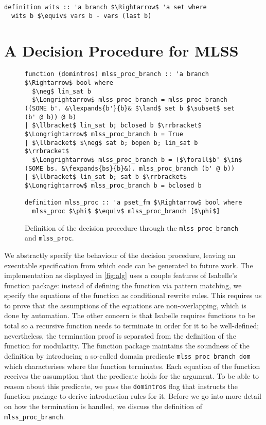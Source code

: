 \documentclass[sigplan,10pt,anonymous,review]{acmart}
\newcommand{\lefttrianglebar}{\mathrel{\tikz[baseline]{\draw (1ex, 0.75ex) -- (0, 1.25ex) -- (0, 0.25ex) -- cycle; \draw (0, 0.75ex) -- (1ex, 0.75ex);}}}
\newcommand{\lefttriangle}{\mathrel{\tikz[baseline]{\draw (1ex, 0.75ex) -- (0, 1.25ex) -- (0, 0.25ex) -- cycle;}}}
\newcommand{\lexpands}[2]{#1 $\lefttriangle$ #2}
\newcommand{\fexpands}[2]{#1 $\lefttrianglebar$ #2}
\begin{document}
\begin{lstlisting}
definition wits :: 'a branch $\Rightarrow$ 'a set where
  wits b $\equiv$ vars b - vars (last b)
\end{lstlisting}

\section{A Decision Procedure for MLSS}
\begin{figure*}
  \centering
\begin{lstlisting}
function (domintros) mlss_proc_branch :: 'a branch $\Rightarrow$ bool where
  $\neg$ lin_sat b
  $\Longrightarrow$ mlss_proc_branch = mlss_proc_branch ((SOME b'. &\lexpands{b'}{b}& $\land$ set b $\subset$ set (b' @ b)) @ b)
| $\llbracket$ lin_sat b; bclosed b $\rrbracket$ $\Longrightarrow$ mlss_proc_branch b = True
| $\llbracket$ $\neg$ sat b; bopen b; lin_sat b $\rrbracket$
  $\Longrightarrow$ mlss_proc_branch b = ($\forall$b' $\in$ (SOME bs. &\fexpands{bs}{b}&). mlss_proc_branch (b' @ b))
| $\llbracket$ lin_sat b; sat b $\rrbracket$ $\Longrightarrow$ mlss_proc_branch b = bclosed b

definition mlss_proc :: 'a pset_fm $\Rightarrow$ bool where
  mlss_proc $\phi$ $\equiv$ mlss_proc_branch [$\phi$]
\end{lstlisting}
\caption{Definition of the decision procedure through the \lstinline|mlss_proc_branch| and \lstinline|mlss_proc|.\label{fig:alg}}
\end{figure*}

\noindent We abstractly specify the behaviour of the decision procedure, leaving an executable specification from which code can be generated to future work.
The implementation as displayed in \autoref{fig:alg} uses a couple features of Isabelle's function package:
instead of defining the function via pattern matching, we specify the equations of the function as conditional rewrite rules.
This requires us to prove that the assumptions of the equations are non-overlapping, which is done by automation.
The other concern is that Isabelle requires functions to be total so a recursive function needs to terminate in order for it to be well-defined;
nevertheless, the termination proof is separated from the definition of the function for modularity.
The function package maintains the soundness of the definition by introducing a so-called domain predicate \lstinline!mlss_proc_branch_dom! which characterises where the function terminates.
Each equation of the function receives the assumption that the predicate holds for the argument.
To be able to reason about this predicate, we pass the \lstinline!domintros! flag that instructs the function package to derive introduction rules for it.
Before we go into more detail on how the termination is handled, we discuss the definition of \lstinline!mlss_proc_branch!.
\end{document}
